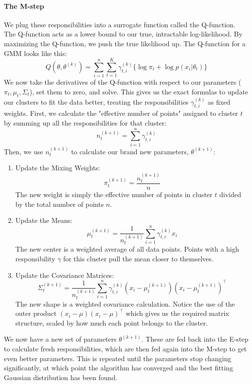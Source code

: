 \documentclass[../Probability.tex]{subfiles}
\begin{document}
\paragraph{The M-step} We plug these responsibilities into a surrogate function called the Q-function. The Q-function acts as a lower bound to our true, intractable log-likelihood. By maximizing the Q-function, we push the true likelihood up.\newline
The Q-function for a GMM looks like this:
$$Q(\theta, \theta^{(k)}) = \sum_{i=1}^n \sum_{t=1}^K \gamma_{t,i}^{(k)} \{\log \pi_t + \log p(x_i | \theta_t)\}$$
We now take the derivatives of the Q-function with respect to our parameters ($\pi_t, \mu_t, \Sigma_t$), set them to zero, and solve. This gives us the exact formulas to update our clusters to fit the data better, treating the responsibilities $\gamma_{t,i}^{(k)}$ as fixed weights.\newline
First, we calculate the "effective number of points" assigned to cluster $t$ by summing up all the responsibilities for that cluster:
$$n_t^{(k+1)} = \sum_{i=1}^n \gamma_{t,i}^{(k)}$$
Then, we use $n_t^{(k+1)}$ to calculate our brand new parameters, $\theta^{(k+1)}$:
\begin{enumerate}
    \item Update the Mixing Weights:
    $$\pi_t^{(k+1)} = \frac{n_t^{(k+1)}}{n}$$
    The new weight is simply the effective number of points in cluster $t$ divided by the total number of points $n$.
    \item Update the Means:
    $$\mu_t^{(k+1)} = \frac{1}{n_t^{(k+1)}} \sum_{i=1}^n \gamma_{t,i}^{(k)} x_i$$
    The new center is a weighted average of all data points. Points with a high responsibility $\gamma$ for this cluster pull the mean closer to themselves.
    \item Update the Covariance Matrices:
    $$\Sigma_t^{(k+1)} = \frac{1}{n_t^{(k+1)}} \sum_{i=1}^n \gamma_{t,i}^{(k)} (x_i - \mu_t^{(k+1)})(x_i - \mu_t^{(k+1)})^\top$$
    The new shape is a weighted covariance calculation. Notice the use of the outer product $(x_i - \mu)(x_i - \mu)^\top$ which gives us the required matrix structure, scaled by how much each point belongs to the cluster.
\end{enumerate}
We now have a new set of parameters $\theta^{(k+1)}$. These are fed back into the E-step to calculate fresh responsibilities, which are then fed again into the M-step to get even better parameters.\newline
This is repeated until the parameters stop changing significantly, at which point the algorithm has converged and the best fitting Gaussian distribution has been found.
\end{document}

